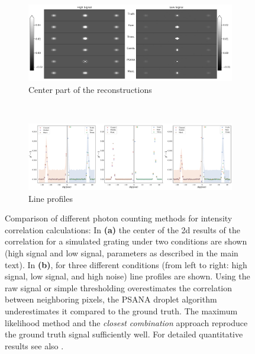 \begin{figure}
	\centering
	\hspace{0.05\textwidth}
	\begin{subfigure}[b]{0.9\textwidth}
		\includegraphics[width=\linewidth]{images/photonreconimg.pdf}	
		\caption{Center part of the reconstructions}
		\label{fig:photonreconimg}
	\end{subfigure}
	\\
	\begin{subfigure}[b]{0.98\textwidth}
		\includegraphics[width=\linewidth]{images/photonrecon.pdf}
		\caption{Line profiles}
		\label{fig:photonrecon}
	\end{subfigure}	
	
	\caption[Comparison of different photon counting methods for intensity correlation calculations]{Comparison of different photon counting methods for intensity correlation calculations: In \textbf{(a)} the center of the 2d results of the correlation for a simulated grating under two conditions are shown (high signal and low signal, parameters as described in the main text). In  \textbf{(b)}, for three different conditions (from left to right: high signal, low signal, and high noise) line profiles are shown. Using the raw signal or simple thresholding overestimates the correlation between neighboring pixels, the PSANA droplet algorithm underestimates it compared to the ground truth. The maximum likelihood method and the \textit{closest combination} approach reproduce the ground truth signal sufficiently well. For detailed quantitative results see also .}
\end{figure}
